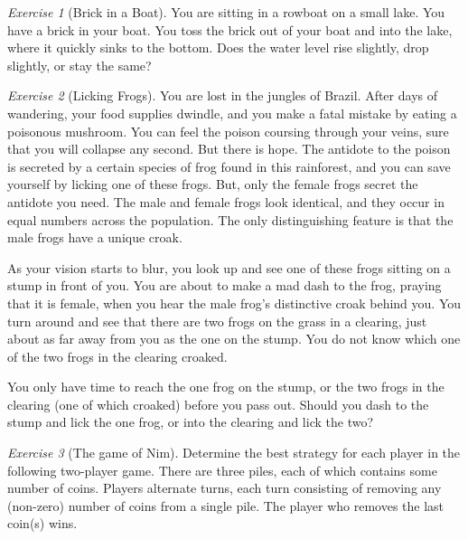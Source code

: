 \documentclass{article}
\theoremstyle{definition}
\theoremstyle{remark}
\newtheorem{exercise}{Exercise}
\begin{document}
    \begin{exercise}[Brick in a Boat]
        You are sitting in a rowboat on a small lake. You have a brick in your boat. You toss the brick out of your boat and into the lake, where it quickly sinks to the bottom. Does the water level rise slightly, drop slightly, or stay the same?
    \end{exercise}
    
    \begin{exercise}[Licking Frogs]
        You are lost in the jungles of Brazil. After days of wandering, your food supplies dwindle, and you make a fatal mistake by eating a poisonous mushroom. You can feel the poison coursing through your veins, sure that you will collapse any second. But there is hope. The antidote to the poison is secreted by a certain species of frog found in this rainforest, and you can save yourself by licking one of these frogs. But, only the female frogs secret the antidote you need. The male and female frogs look identical, and they occur in equal numbers across the population. The only distinguishing feature is that the male frogs have a unique croak.

        As your vision starts to blur, you look up and see one of these frogs sitting on a stump in front of you. You are about to make a mad dash to the frog, praying that it is female, when you hear the male frog's distinctive croak behind you. You turn around and see that there are two frogs on the grass in a clearing, just about as far away from you as the one on the stump. You do not know which one of the two frogs in the clearing croaked.

        You only have time to reach the one frog on the stump, or the two frogs in the clearing (one of which croaked) before you pass out. Should you dash to the stump and lick the one frog, or into the clearing and lick the two?
    \end{exercise}
    
    \begin{exercise}[The game of Nim]
        Determine the best strategy for each player in the following two-player game. There are three piles, each of which contains some number of coins. Players alternate turns, each turn consisting of removing any (non-zero) number of coins from a single pile. The player who removes the last coin(s) wins.
    \end{exercise}
\end{document}
